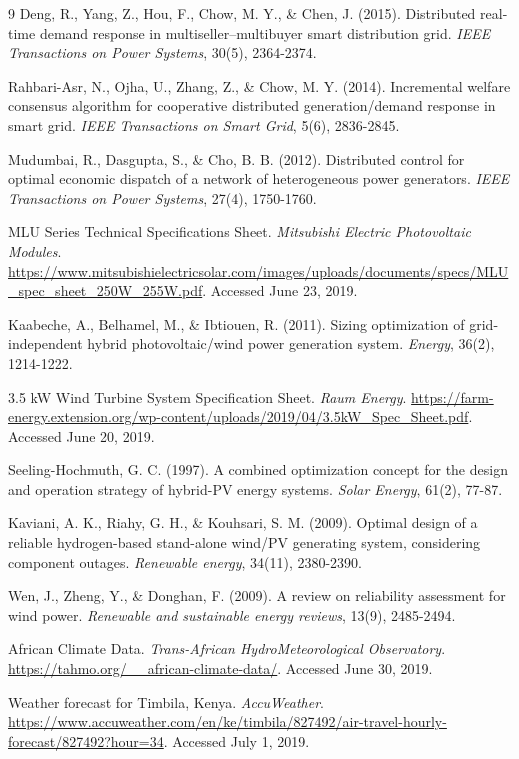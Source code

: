 \documentclass[final,3p,times]{elsarticle}
\begin{document}
\begin{thebibliography}{9}
Deng, R., Yang, Z., Hou, F., Chow, M. Y., \& Chen, J. (2015). Distributed real-time demand response in multiseller–multibuyer smart distribution grid. \textit{IEEE Transactions on Power Systems}, 30(5), 2364-2374.

Rahbari-Asr, N., Ojha, U., Zhang, Z., \& Chow, M. Y. (2014). Incremental welfare consensus algorithm for cooperative distributed generation/demand response in smart grid. \textit{IEEE Transactions on Smart Grid}, 5(6), 2836-2845.

Mudumbai, R., Dasgupta, S., \& Cho, B. B. (2012). Distributed control for optimal economic dispatch of a network of heterogeneous power generators. \textit{IEEE Transactions on Power Systems}, 27(4), 1750-1760.

MLU Series Technical Specifications Sheet. \textit{Mitsubishi Electric Photovoltaic Modules}. \url{https://www.mitsubishielectricsolar.com/images/uploads/documents/specs/MLU_spec_sheet_250W_255W.pdf}. Accessed June 23, 2019.

Kaabeche, A., Belhamel, M., \& Ibtiouen, R. (2011). Sizing optimization of grid-independent hybrid photovoltaic/wind power generation system. \textit{Energy}, 36(2), 1214-1222.

3.5 kW Wind Turbine System Specification Sheet. \textit{Raum Energy}. \url{https://farm-energy.extension.org/wp-content/uploads/2019/04/3.5kW_Spec_Sheet.pdf}. Accessed June 20, 2019.

Seeling-Hochmuth, G. C. (1997). A combined optimization concept for the design and operation strategy of hybrid-PV energy systems. \textit{Solar Energy}, 61(2), 77-87.

Kaviani, A. K., Riahy, G. H., \& Kouhsari, S. M. (2009). Optimal design of a reliable hydrogen-based stand-alone wind/PV generating system, considering component outages. \textit{Renewable energy}, 34(11), 2380-2390.

Wen, J., Zheng, Y., \& Donghan, F. (2009). A review on reliability assessment for wind power. \textit{Renewable and sustainable energy reviews}, 13(9), 2485-2494.

African Climate Data. \textit{Trans-African HydroMeteorological Observatory}.
\url{https://tahmo.org/__african-climate-data/}. Accessed June 30, 2019.

Weather forecast for Timbila, Kenya. \textit{AccuWeather}.
\url{https://www.accuweather.com/en/ke/timbila/827492/air-travel-hourly-forecast/827492?hour=34}. Accessed July 1, 2019.


\end{thebibliography}
\end{document}
